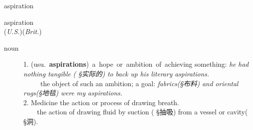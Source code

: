 \documentclass[avery5372, grid]{flashcards}
\begin{document}
\begin{flashcard}{\Huge aspiration}
	\begin{center}
		{\LARGE as\textbullet pi\textbullet ra\textbullet tion}\\
		(\textit{U.S.})\hspace{0.25cm}(\textit{Brit.})
	\end{center}
	\begin{description}
		
			
			
			
		
		\item[noun] %
			
			1. \mbox{(usu. \textbf{aspirations}) a hope or ambition of achieving} something: \textit{he had nothing tangible \textnormal{( {\S 实际的})} to back up his literary aspirations.}\\%
			\ \ \ \ \textbullet\ the object of such an ambition; a goal: \textit{fabrics\textnormal{({\S 布料})} and oriental rugs\textnormal{({\S 地毯})} were my aspirations.}\\
			
			2. {\A Medicine} the action or process of drawing breath.\\
			\ \ \ \textbullet\ the action of drawing fluid by suction ( {\S 抽吸}) from a vessel or cavity( {\S 洞}).\\
			

\end{description}
\end{flashcard}
\end{document}

